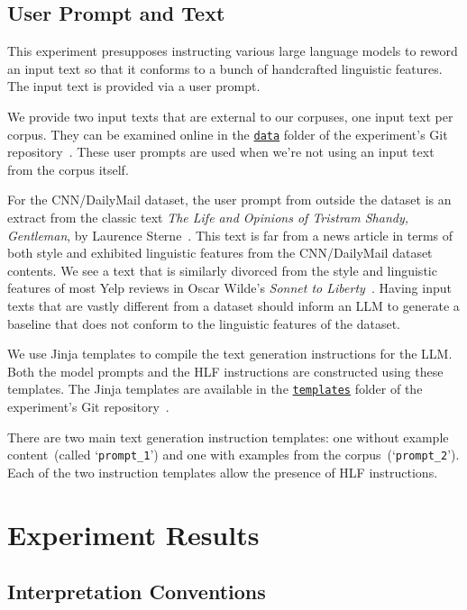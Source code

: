 \documentclass[runningheads,a4paper,11pt]{article}
\begin{document}
\subsection{User Prompt and Text}\label{input-text}

This experiment presupposes instructing various large language models to reword
an input text so that it conforms to a bunch of handcrafted linguistic features.
The input text is provided via a user prompt.

We provide two input texts that are external to our corpuses, one input text per
corpus.
They can be examined online in the
\texttt{\href{https://github.com/koosie0507/llm-tst-consistency/tree/main/data}{data}}
folder of the experiment's Git repository~\cite{olar2024experimentcode}.
These user prompts are used when we're not using an input text from the
corpus itself.

For the CNN/DailyMail dataset, the user prompt from outside the dataset is an
extract from the classic text \textit{The Life and Opinions of Tristram Shandy,
    Gentleman}, by Laurence Sterne~\cite{sterne2003life}.
This text is far from a news article in terms of both style and exhibited
linguistic features from the CNN/DailyMail dataset contents.
We see a text that is similarly divorced from the style and linguistic
features of most Yelp reviews in Oscar Wilde's \textit{Sonnet to
    Liberty}~\cite{wilde1909poems}.
Having input texts that are vastly different from a dataset should inform an LLM
to generate a baseline that does not conform to the linguistic features of the
dataset.

We use Jinja templates to compile the text generation instructions for the LLM.
Both the model prompts and the HLF instructions are constructed using these
templates.
The Jinja templates are available in the
\texttt{\href{https://github.com/koosie0507/llm-tst-consistency/tree/main/data}{templates}}
folder of the experiment's Git repository~\cite{olar2024experimentcode}.

There are two main text generation instruction templates: one without example
content~(called `\texttt{prompt\_1}') and one with examples from the
corpus~(`\texttt{prompt\_2}').
Each of the two instruction templates allow the presence of HLF instructions.

\section{Experiment Results}

\subsection{Interpretation Conventions}
\end{document}
